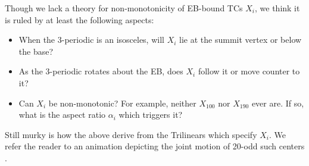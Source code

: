 Though we lack a theory for non-monotonicity of EB-bound TCs $X_i$, we think it is ruled by at least the following aspects:

\begin{itemize}
    \item When the 3-periodic is an isosceles, will $X_i$ lie at the summit vertex or below the base?
    \item As the 3-periodic rotates about the EB, does $X_i$ follow it or move counter to it?
    \item Can $X_i$ be non-monotonic? For example, neither $X_{100}$ nor $X_{190}$ ever are. If so, what is the aspect ratio $\alpha_i$ which triggers it?
\end{itemize}

Still murky is how the above derive from the Trilinears which specify $X_i$. We refer the reader to an animation depicting the joint motion of 20-odd such centers \cite[PL\#15]{reznik2020-playlist-intriguing}.
